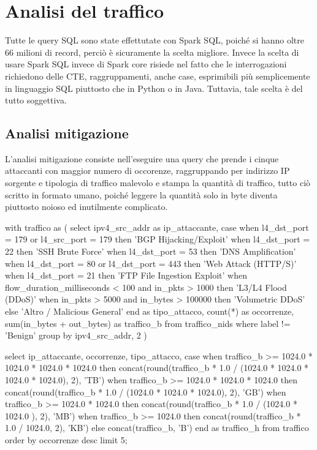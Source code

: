 \documentclass[10pt,a4paper]{article}
\begin{document}
    \section{Analisi del traffico}
    Tutte le query SQL sono state effettutate con Spark SQL, poiché si hanno oltre 66 milioni di record, perciò è
    sicuramente la scelta migliore. Invece la scelta di usare Spark SQL invece di Spark core risiede nel fatto che
    le interrogazioni richiedono delle CTE, raggruppamenti, anche case, esprimibili più semplicemente in linguaggio
    SQL piuttosto che in Python o in Java. Tuttavia, tale scelta è del tutto soggettiva.
    \subsection{Analisi mitigazione}
    L'analisi mitigazione consiste nell'eseguire una query che prende i cinque attaccanti con maggior numero di occorenze,
    raggruppando per indirizzo IP sorgente e tipologia di traffico malevolo e 
    stampa la quantità di traffico, tutto ciò scritto in formato umano, poiché leggere la quantità solo in byte diventa piuttosto noioso ed inutilmente
    complicato.
    \begin{sqllisting}[caption={Analisi del traffico malevolo per indirizzo IP}, label=lst:analisi_traffico]
    with traffico as (
        select ipv4_src_addr as ip_attaccante,
            case
                    when l4_dst_port = 179 or l4_src_port = 179 then 'BGP Hijacking/Exploit'
                    when l4_dst_port = 22 then 'SSH Brute Force'
                    when l4_dst_port = 53 then 'DNS Amplification'
                    when l4_dst_port = 80 or l4_dst_port = 443 then 'Web Attack (HTTP/S)'
                    when l4_dst_port = 21 then 'FTP File Ingestion Exploit'
                    when flow_duration_milliseconds < 100 and in_pkts > 1000 then 'L3/L4 Flood (DDoS)'
                    when in_pkts > 5000 and in_bytes > 100000 then 'Volumetric DDoS'
                    else 'Altro / Malicious General'
            end as tipo_attacco,
            count(*) as occorrenze,
            sum(in_bytes + out_bytes) as traffico_b
        from traffico_nids
        where label != 'Benign'
        group by ipv4_src_addr, 2
    )

    select ip_attaccante,
        occorrenze,
        tipo_attacco,
        case
                when traffico_b >= 1024.0 * 1024.0 * 1024.0 * 1024.0 then concat(round(traffico_b * 1.0 / (1024.0 * 1024.0 * 1024.0 * 1024.0), 2), 'TB')
                when traffico_b >= 1024.0 * 1024.0 * 1024.0 then concat(round(traffico_b * 1.0 / (1024.0 * 1024.0 * 1024.0), 2), 'GB')
                when traffico_b >= 1024.0 * 1024.0 then concat(round(traffico_b * 1.0 / (1024.0 * 1024.0 ), 2), 'MB')
                when traffico_b >= 1024.0 then concat(round(traffico_b * 1.0 / 1024.0, 2), 'KB')
                else concat(traffico_b, 'B')
            end as traffico_h
    from traffico
    order by occorrenze desc
    limit 5;
    \end{sqllisting}
\end{document}
